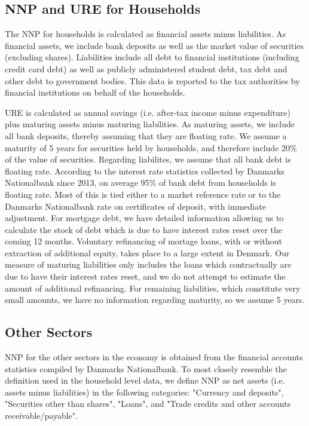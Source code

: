 \documentclass[titlepage]{\econtex}\newcommand{\texname}{ConsumptionHeterogeneity}
\begin{document}
\subsection{NNP and URE for Households}
The NNP for households is calculated as financial assets minus liabilities. As financial assets, we include bank deposits as well as the market value of securities (excluding shares). Liabilities include all debt to financial institutions (including credit card debt) as well as publicly administered student debt, tax debt and other debt to government bodies. This data is reported to the tax authorities by financial institutions on behalf of the households. 

URE is calculated as annual savings (i.e. after-tax income minus expenditure) plus maturing assets minus maturing liabilities. As maturing assets, we include all bank deposits, thereby assuming that they are floating rate. We assume a maturity of 5 years for securities held by households, and therefore include 20\% of the value of securities. Regarding liabilites, we assume that all bank debt is floating rate. According to the interest rate statistics collected by Danmarks Nationalbank since 2013, on average 95\% of bank debt from households is floating rate. Most of this is tied either to a market reference rate or to the Danmarks Nationalbank rate on certificates of deposit, with immediate adjustment. For mortgage debt, we have detailed information allowing us to calculate the stock of debt which is due to have interest rates reset over the coming 12 months. Voluntary refinancing of mortage loans, with or without extraction of additional equity, takes place to a large extent in Denmark. Our measure of maturing liabilities only includes the loans which contractually are due to have their interest rates reset, and we do not attempt to estimate the amount of additional refinancing. For remaining liabilities, which constitute very small amounts, we have no information regarding maturity, so we assume 5 years. 

\subsection{Other Sectors}
NNP for the other sectors in the economy is obtained from the financial accounts statistics compiled by Danmarks Nationalbank. To most closely resemble the definition used in the household level data, we define NNP as net assets (i.e. assets minus liabilities) in the following categories: "Currency and deposits", "Securities other than shares", "Loans", and "Trade credits and other accounts receivable/payable". 
\end{document}
